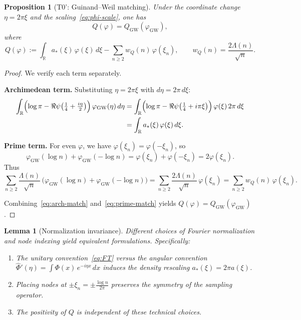 \documentclass[11pt,a4paper]{article}
\newtheorem{lemma}[theorem]{Lemma}
\newtheorem{proposition}[theorem]{Proposition}
\theoremstyle{definition}
\theoremstyle{remark}
\newcommand{\R}{\mathbb{R}}
\begin{document}
\begin{proposition}[T0': Guinand--Weil matching]\label{prop:T0}
Under the coordinate change $\eta = 2\pi\xi$ and the scaling~\eqref{eq:phi-scale}, one has
\begin{equation}\label{eq:T0-identity}
  Q(\varphi) = Q_{\mathrm{GW}}(\varphi_{\mathrm{GW}}),
\end{equation}
where
\begin{equation}\label{eq:Q-repo}
  Q(\varphi) := \int_\R a_*(\xi)\, \varphi(\xi)\, d\xi - \sum_{n \geq 2} w_Q(n)\, \varphi(\xi_n),
  \qquad
  w_Q(n) = \frac{2\Lambda(n)}{\sqrt{n}}.
\end{equation}
\end{proposition}

\begin{proof}
We verify each term separately.

\textbf{Archimedean term.} Substituting $\eta = 2\pi\xi$ with $d\eta = 2\pi\, d\xi$:
\begin{align}
  \int_\R \Bigl(\log\pi - \Re\psi\bigl(\tfrac{1}{4} + \tfrac{i\eta}{2}\bigr)\Bigr)\, \varphi_{\mathrm{GW}}(\eta)\, d\eta
  &= \int_\R \Bigl(\log\pi - \Re\psi\bigl(\tfrac{1}{4} + i\pi\xi\bigr)\Bigr)\, \varphi(\xi)\, 2\pi\, d\xi \notag \\
  &= \int_\R a_*(\xi)\, \varphi(\xi)\, d\xi. \label{eq:arch-match}
\end{align}

\textbf{Prime term.} For even $\varphi$, we have $\varphi(\xi_n) = \varphi(-\xi_n)$, so
\[
  \varphi_{\mathrm{GW}}(\log n) + \varphi_{\mathrm{GW}}(-\log n) = \varphi(\xi_n) + \varphi(-\xi_n) = 2\varphi(\xi_n).
\]
Thus
\begin{equation}\label{eq:prime-match}
  \sum_{n \geq 2} \frac{\Lambda(n)}{\sqrt{n}}\, \bigl(\varphi_{\mathrm{GW}}(\log n) + \varphi_{\mathrm{GW}}(-\log n)\bigr)
  = \sum_{n \geq 2} \frac{2\Lambda(n)}{\sqrt{n}}\, \varphi(\xi_n)
  = \sum_{n \geq 2} w_Q(n)\, \varphi(\xi_n).
\end{equation}

Combining~\eqref{eq:arch-match} and~\eqref{eq:prime-match} yields $Q(\varphi) = Q_{\mathrm{GW}}(\varphi_{\mathrm{GW}})$.
\end{proof}

\begin{lemma}[Normalization invariance]\label{lem:norm-inv}
Different choices of Fourier normalization and node indexing yield equivalent formulations. Specifically:
\begin{enumerate}[label=(\alph*)]
\item The unitary convention~\eqref{eq:FT} versus the angular convention $\widehat{\Phi}'(\eta) = \int \Phi(x)\, e^{-i\eta x}\, dx$ induces the density rescaling $a_*(\xi) = 2\pi a(\xi)$.

\item Placing nodes at $\pm\xi_n = \pm\frac{\log n}{2\pi}$ preserves the symmetry of the sampling operator.

\item The positivity of $Q$ is independent of these technical choices.
\end{enumerate}
\end{lemma}
\end{document}
